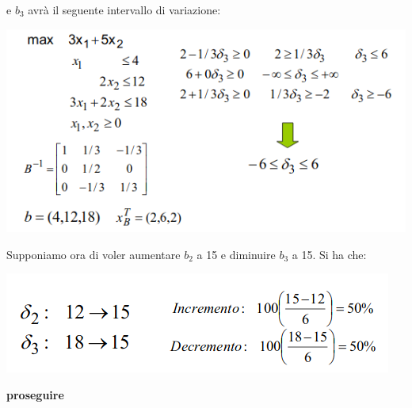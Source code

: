 \message{ !name(ro.tex)}\documentclass[a4paper,12pt, oneside]{book}
\begin{document}
\begin{esempio}
\begin{center}
  \end{center}
  e $b_3$ avrà il seguente intervallo di variazione:
  \begin{center}
    \includegraphics[scale = 0.7]{img/add4.png}
  \end{center}
  Supponiamo ora di voler aumentare $b_2$ a 15 e diminuire $b_3$ a
  15. Si ha che:
  \begin{center}
    \includegraphics[scale = 0.6]{img/add5.png}
  \end{center}
\end{esempio}
\textbf{proseguire}
\end{document}
